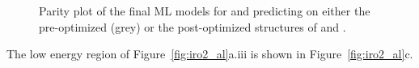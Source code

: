 

\begin{figure}[!htb]
\centering
{}
\caption{\label{fig:parity}
%
Parity plot of the final ML models for \IrOtwo and \IrOthree predicting on either the pre-optimized (grey) or the post-optimized structures of \IrOtwo and \IrOthree.
}
\end{figure}


The low energy region of Figure~\ref{fig:iro2_al}a.iii is shown in Figure~\ref{fig:iro2_al}c.
%



